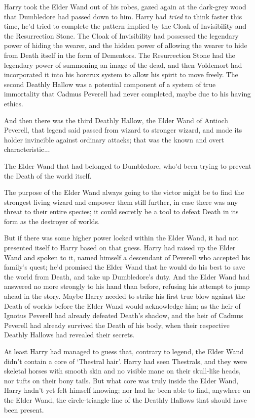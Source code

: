 Harry took the Elder Wand out of his robes, gazed again at the dark-grey wood that Dumbledore had passed down to him. Harry had \emph{tried} to think faster this time, he'd tried to complete the pattern implied by the Cloak of Invisibility and the Resurrection Stone. The Cloak of Invisibility had possessed the legendary power of hiding the wearer, and the hidden power of allowing the wearer to hide from Death itself in the form of Dementors. The Resurrection Stone had the legendary power of summoning an image of the dead, and then Voldemort had incorporated it into his horcrux system to allow his spirit to move freely. The second Deathly Hallow was a potential component of a system of true immortality that Cadmus Peverell had never completed, maybe due to his having ethics.

And then there was the third Deathly Hallow, the Elder Wand of Antioch Peverell, that legend said passed from wizard to stronger wizard, and made its holder invincible against ordinary attacks; that was the known and overt characteristic...

The Elder Wand that had belonged to Dumbledore, who'd been trying to prevent the Death of the world itself.

The purpose of the Elder Wand always going to the victor might be to find the strongest living wizard and empower them still further, in case there was any threat to their entire species; it could secretly be a tool to defeat Death in its form as the destroyer of worlds.

But if there was some higher power locked within the Elder Wand, it had not presented itself to Harry based on that guess. Harry had raised up the Elder Wand and spoken to it, named himself a descendant of Peverell who accepted his family's quest; he'd promised the Elder Wand that he would do his best to save the world from Death, and take up Dumbledore's duty. And the Elder Wand had answered no more strongly to his hand than before, refusing his attempt to jump ahead in the story. Maybe Harry needed to strike his first true blow against the Death of worlds before the Elder Wand would acknowledge him; as the heir of Ignotus Peverell had already defeated Death's shadow, and the heir of Cadmus Peverell had already survived the Death of his body, when their respective Deathly Hallows had revealed their secrets.

At least Harry had managed to guess that, contrary to legend, the Elder Wand didn't contain a core of `Thestral hair'. Harry had seen Thestrals, and they were skeletal horses with smooth skin and no visible mane on their skull-like heads, nor tufts on their bony tails. But what core was truly inside the Elder Wand, Harry hadn't yet felt himself knowing; nor had he been able to find, anywhere on the Elder Wand, the circle-triangle-line of the Deathly Hallows that should have been present.

